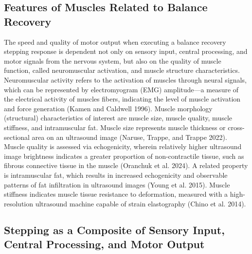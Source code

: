 \documentclass[
  letterpaper,
  DIV=11,
  numbers=noendperiod]{scrartcl}
\begin{document}
\subsection{Features of Muscles Related to Balance
Recovery}\label{features-of-muscles-related-to-balance-recovery}

The speed and quality of motor output when executing a balance recovery
stepping response is dependent not only on sensory input, central
processing, and motor signals from the nervous system, but also on the
quality of muscle function, called neuromuscular activation, and muscle
structure characteristics. Neuromuscular activity refers to the
activation of muscles through neural signals, which can be represented
by electromyogram (EMG) amplitude---a measure of the electrical activity
of muscles fibers, indicating the level of muscle activation and force
generation (Kamen and Caldwell 1996). Muscle morphology (structural)
characteristics of interest are muscle size, muscle quality, muscle
stiffness, and intramuscular fat. Muscle size represents muscle
thickness or cross-sectional area on an ultrasound image (Naruse,
Trappe, and Trappe 2022). Muscle quality is assessed via echogenicity,
wherein relatively higher ultrasound image brightness indicates a
greater proportion of non-contractile tissue, such as fibrous connective
tissue in the muscle (Oranchuk et al. 2024). A related property is
intramuscular fat, which results in increased echogenicity and
observable patterns of fat infiltration in ultrasound images (Young et
al. 2015). Muscle stiffness indicates muscle tissue resistance to
deformation, measured with a high-resolution ultrasound machine capable
of strain elastography (Chino et al. 2014).

\subsection{Stepping as a Composite of Sensory Input, Central
Processing, and Motor
Output}\label{stepping-as-a-composite-of-sensory-input-central-processing-and-motor-output}
\end{document}
